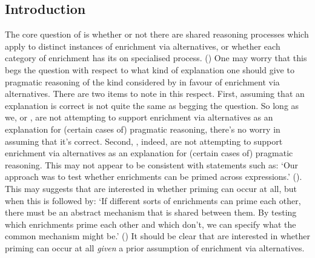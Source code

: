 \documentclass[10pt]{article}
\begin{document}
\maketitle

\begin{multicols}{2}



\section{Introduction}
\label{sec:introduction}

The core question of \textcite{Bott:2016aa} is whether or not there are shared reasoning processes which apply to distinct instances of enrichment via alternatives, or whether each category of enrichment has its on specialised process.
(\citeyear[118]{Bott:2016aa})
One may worry that this begs the question with respect to what kind of explanation one should give to pragmatic reasoning of the kind considered by \citeauthor{Bott:2016aa} in favour of enrichment via alternatives.
There are two items to note in this respect.
First, assuming that an explanation is correct is not quite the same as begging the question.
So long as we, or \citeauthor{Bott:2016aa}, are not attempting to support enrichment via alternatives as an explanation for (certain cases of) pragmatic reasoning, there's no worry in assuming that it's correct.
Second, \citeauthor{Bott:2016aa}, indeed, are not attempting to support enrichment via alternatives as an explanation for (certain cases of) pragmatic reasoning.
This may not appear to be consistent with statements such as:
`Our approach was to test whether enrichments can be primed across expressions.' (\citeyear[118]{Bott:2016aa}).
This may suggests that \citeauthor{Bott:2016aa} are interested in whether priming can occur at all, but when this is followed by:
`If different sorts of enrichments can prime each other, there must be an abstract mechanism that is shared between them.
By testing which enrichments prime each other and which don’t, we can specify what the common mechanism might be.' (\citeyear[118]{Bott:2016aa})
It should be clear that \citeauthor{Bott:2016aa} are interested in whether priming can occur at all \emph{given} a prior assumption of enrichment via alternatives.


\end{multicols}
\end{document}
